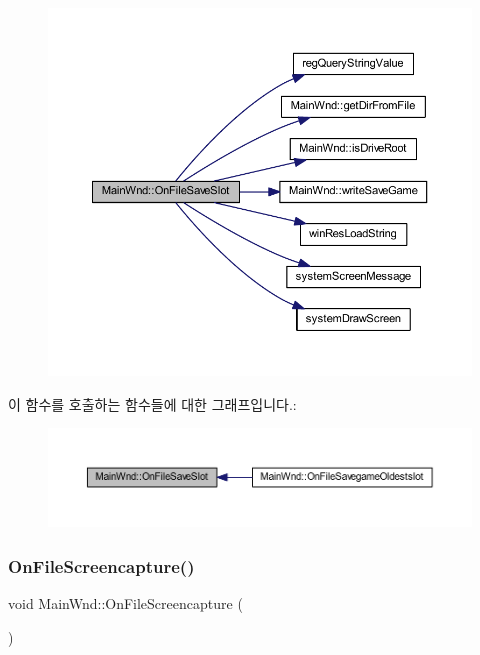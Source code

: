 \begin{figure}[H]
\begin{center}
\leavevmode
\includegraphics[width=350pt]{class_main_wnd_aa10e0e321035d0cd1e1e953529df5f19_cgraph}
\end{center}
\end{figure}
이 함수를 호출하는 함수들에 대한 그래프입니다.\+:
\nopagebreak
\begin{figure}[H]
\begin{center}
\leavevmode
\includegraphics[width=350pt]{class_main_wnd_aa10e0e321035d0cd1e1e953529df5f19_icgraph}
\end{center}
\end{figure}
\mbox{\label{class_main_wnd_a869b47c3aae70c534109b9a8310e1faf}} 
\subsubsection{\texorpdfstring{On\+File\+Screencapture()}{OnFileScreencapture()}}
{\footnotesize\ttfamily void Main\+Wnd\+::\+On\+File\+Screencapture (\begin{DoxyParamCaption}{ }\end{DoxyParamCaption})\hspace{0.3cm}{\ttfamily [protected]}}



